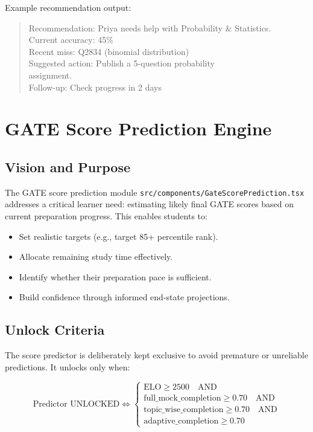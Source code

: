\documentclass[sigconf,authordraft,twoside]{acmart}
\newcommand{\tech}[1]{\textcolor{brandblue}{\nolinkurl{#1}}}
\begin{document}
Example recommendation output:

\begin{quote}
\footnotesize\ttfamily
Recommendation: Priya needs help with Probability \& Statistics.\\
Current accuracy: 45\%\\
Recent miss: Q2834 (binomial distribution)\\
Suggested action: Publish a 5-question probability\\
assignment.\\
Follow-up: Check progress in 2 days
\end{quote}

\section{GATE Score Prediction Engine} \label{sec:score-prediction}

\subsection{Vision and Purpose}

The GATE score prediction module \tech{src/components/GateScorePrediction.tsx} addresses a critical learner need: estimating likely final GATE scores based on current preparation progress. This enables students to:

\begin{itemize}
\item Set realistic targets (e.g., target 85+ percentile rank).
\item Allocate remaining study time effectively.
\item Identify whether their preparation pace is sufficient.
\item Build confidence through informed end-state projections.
\end{itemize}

\subsection{Unlock Criteria}

The score predictor is deliberately kept exclusive to avoid premature or unreliable predictions. It unlocks only when:

\begin{equation}
\text{Predictor UNLOCKED} \iff \begin{cases}
\text{ELO} \geq 2500 \quad \text{AND} \\
\text{full\_mock\_completion} \geq 0.70 \quad \text{AND} \\
\text{topic\_wise\_completion} \geq 0.70 \quad \text{AND} \\
\text{adaptive\_completion} \geq 0.70
\end{cases}
\end{equation}
\end{document}
